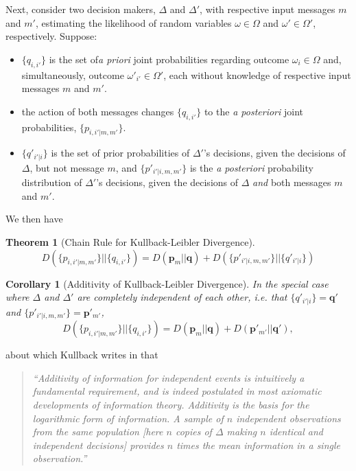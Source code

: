 \documentclass[11pt]{article}
\newtheorem{theorem}{Theorem}[subsection]
\newtheorem*{corollary}{Corollary}
\begin{document}
Next, consider two decision makers, $\Delta$ and $\Delta'$, with respective input messages $m$ and $m'$, estimating the likelihood of random variables $\omega \in \Omega$ and $\omega' \in \Omega'$, respectively.  Suppose:
\begin{itemize}
\item $\{q_{i,i'}\}$ is the set of{\it a priori} joint probabilities regarding outcome $\omega_i \in \Omega$ and, simultaneously, outcome $\omega'_{i'} \in \Omega'$, each without knowledge of respective input messages $m$ and $m'$.
\item the action of both messages changes $\{q_{i,i'}\}$ to the {\it a posteriori} joint probabilities, $\{p_{i,i'|m, m'}\}$.
\item $\{q'_{i'|i}\}$ is the set of prior probabilities of $\Delta'$'s decisions, given the decisions of $\Delta$, but not message $m$, and $\{p'_{i'|i,m,m'}\}$ is the {\it a posteriori} probability distribution of $\Delta'$'s decisions, given the decisions of $\Delta$ {\it and} both messages $m$ and $m'$.  

\end{itemize}
We then have 
\begin{theorem}[Chain Rule for Kullback-Leibler Divergence]
\label{DivergenceChainRule}
$$
D(\{p_{i,i'|m, m'}\} || \{q_{i,i'}\}) 
= D(\mathbf p_m || \mathbf q) + D(\{p'_{i'|i,m,m'}\} || \{q'_{i'|i}\})
$$
\end{theorem}

\begin{corollary}[Additivity of Kullback-Leibler Divergence]
\label{KLAdditivity}
In the special case where $\Delta$ and $\Delta'$ are completely independent of each other, {\rm i.e.} that $\{q'_{i'|i}\} = \mathbf q'$ and $\{p'_{i'|i,m,m'}\} =\mathbf p'_{m'}$, 
$$
D(\{p_{i,i'|m,m'}\} || \{q_{i,i'}\})  = D(\mathbf p_m|| \mathbf q) + D(\mathbf p'_{m'}|| \mathbf q'),
$$
\end{corollary}
about which Kullback writes in \cite{Kullback} that 
\begin{quote}
\it{``Additivity of information for independent events is intuitively a fundamental requirement, and is indeed postulated in most axiomatic developments of information theory.  Additivity is the basis for the logarithmic form of information.  A sample of $n$ independent observations from the same population {\rm [here $n$ copies of $\Delta$ making $n$ identical and independent decisions]} provides $n$ times the mean information in a single observation.''}
\end{quote}
\end{document}
